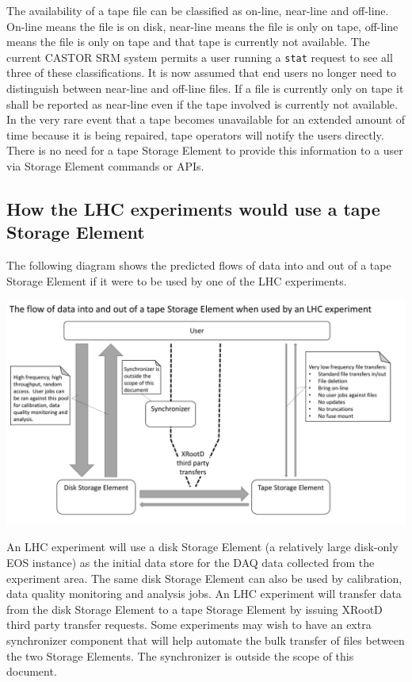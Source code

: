 \documentclass{article}
\begin{document}
The availability of a tape file can be classified as on-line, near-line and off-line.  On-line means the file is on disk, near-line means the file is only on tape, off-line means the file is only on tape and that tape is currently not available.  The current CASTOR SRM system permits a user running a \texttt{stat} request to see all three of these classifications.  It is now assumed that end users no longer need to distinguish between near-line and off-line files.  If a file is currently only on tape it shall be reported as near-line even if the tape involved is currently not available.  In the very rare event that a tape becomes unavailable for an extended amount of time because it is being repaired, tape operators will notify the users directly.  There is no need for a tape Storage Element to provide this information to a user via Storage Element commands or APIs.

\newpage
\subsection{How the LHC experiments would use a tape Storage Element}
The following diagram shows the predicted flows of data into and out of a tape Storage Element if it were to be used by one of the LHC experiments.

\includegraphics[width=\linewidth]{CTA_tape_se_data_flow_lhc}

An LHC experiment will use a disk Storage Element (a relatively large disk-only EOS instance) as the initial data store for the DAQ data collected from the experiment area.  The same disk Storage Element can also be used by calibration, data quality monitoring and analysis jobs.  An LHC experiment will transfer data from the disk Storage Element to a tape Storage Element by issuing XRootD third party transfer requests.  Some experiments may wish to have an extra synchronizer component that will help automate the bulk transfer of files between the two Storage Elements.  The synchronizer is outside the scope of this document.
\end{document}
